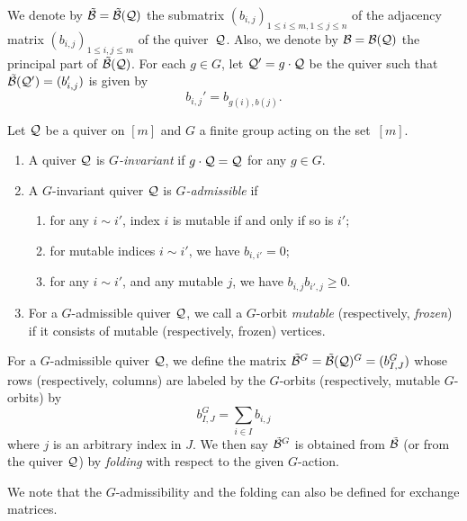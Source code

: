 We denote by $\mathcal{\tilde{B}} = \mathcal{\tilde{B}}(\mathcal{Q})$ the submatrix $(b_{i,j})_{1\le i\le m, 1 \le j \le n}$ of the adjacency matrix $(b_{i,j})_{1 \le i,j\le m}$ of the quiver~$\mathcal{Q}$. 
Also, we denote by $\mathcal{B} = \mathcal{B}(\mathcal{Q})$ the principal part of $\mathcal{\tilde{B}}(\mathcal{Q})$.
For each $g \in G$, let $\mathcal{Q}' = g \cdot \mathcal{Q}$ be the quiver such that $\mathcal{\tilde{B}}(\mathcal{Q}') = (b_{i,j}')$ is given by
\[
b_{i,j}' = b_{g(i),b(j)}.
\]
\begin{definition}\label{definition:admissible quiver}
    Let $\mathcal{Q}$ be a quiver on $[m]$ and $G$ a finite
    group acting on the set~$[m]$.
\begin{enumerate} 
\item A quiver $\mathcal{Q}$ is \emph{$G$-invariant} if $g \cdot \mathcal{Q} = \mathcal{Q}$ for any $g \in G$.
\item A $G$-invariant quiver $\mathcal{Q}$ is \emph{$G$-admissible} if \label{admissible}
\begin{enumerate}
\item for any $i \sim i'$, index $i$ is mutable if and only if so is $i'$; \label{mutable}
\item for mutable indices $i \sim i'$, we have $b_{i,i'} = 0$; \label{bii'=0}
\item for any $i \sim i'$, and any mutable $j$, we have $b_{i,j} b_{i',j} \geq 0$.\label{nonnegativity_of_bijbi'j}
\end{enumerate}
\item For a $G$-admissible quiver $\mathcal{Q}$, we call a $G$-orbit \emph{mutable} (respectively, \emph{frozen}) if it consists of mutable (respectively, frozen) vertices. 
\end{enumerate}         
\end{definition}
For a $G$-admissible quiver $\mathcal{Q}$, we define the matrix $\mathcal{\tilde{B}}^G =
\mathcal{\tilde{B}}(\mathcal{Q})^G = (b_{I,J}^G)$ whose rows (respectively, columns) are
labeled by the $G$-orbits (respectively, mutable $G$-orbits) by
\[
    b_{I,J}^G = \sum_{i \in I} b_{i,j}
\]
where $j$ is an arbitrary index in $J$. We then say $\mathcal{\tilde{B}}^G$ is obtained
from $\mathcal{\tilde{B}}$ (or from the quiver $\mathcal{Q}$) by \textit{folding} with
respect to the given $G$-action.
\begin{remark}
We note that the $G$-admissibility and the folding can also be defined for exchange matrices. 
\end{remark}
